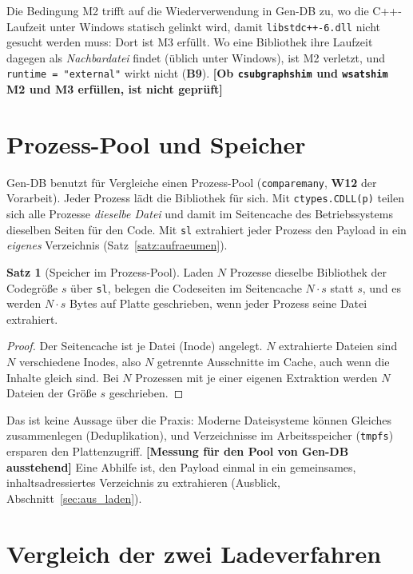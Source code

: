 \documentclass[a4paper,12pt,twoside]{report}
\DeclareRobustCommand{\_}{\ifmmode\mbox{\textunderscore}\else\textunderscore\allowbreak{}\fi}
\theoremstyle{definition}
\newtheorem{satz}{Satz}[chapter]
\newcommand{\offen}[1]{\textcolor{accentred}{\textbf{[#1]}}}
\newcommand{\W}[1]{\textbf{W#1}}
\newcommand{\Bf}[1]{\textbf{B#1}}
\begin{document}
Die Bedingung M2 trifft auf die Wiederverwendung in Gen-DB zu, wo die C++-Laufzeit unter Windows statisch gelinkt wird, damit \texttt{libstdc++-6.dll} nicht gesucht werden muss: Dort ist M3 erfüllt. Wo eine Bibliothek ihre Laufzeit dagegen als \emph{Nachbardatei} findet (üblich unter Windows), ist M2 verletzt, und \texttt{runtime = "external"} wirkt nicht (\Bf{9}). \offen{Ob \texttt{csubgraph\_shim} und \texttt{wsat\_shim} M2 und M3 erfüllen, ist nicht geprüft}

\section{Prozess-Pool und Speicher}
\label{sec:pool}

Gen-DB benutzt für Vergleiche einen Prozess-Pool (\texttt{compare\_many}, \W{12} der Vorarbeit). Jeder Prozess lädt die Bibliothek für sich. Mit \texttt{ctypes.CDLL(p)} teilen sich alle Prozesse \emph{dieselbe Datei} und damit im Seitencache des Betriebssystems dieselben Seiten für den Code. Mit \texttt{sl} extrahiert jeder Prozess den Payload in ein \emph{eigenes} Verzeichnis (Satz~\ref{satz:aufraeumen}).

\begin{satz}[Speicher im Prozess-Pool]
	\label{satz:pool}
	Laden $N$ Prozesse dieselbe Bibliothek der Codegröße $s$ über \texttt{sl}, belegen die Codeseiten im Seitencache $N\cdot s$ statt $s$, und es werden $N\cdot s$ Bytes auf Platte geschrieben, wenn jeder Prozess seine Datei extrahiert.
\end{satz}

\begin{proof}
	Der Seitencache ist je Datei (Inode) angelegt. $N$ extrahierte Dateien sind $N$ verschiedene Inodes, also $N$ getrennte Ausschnitte im Cache, auch wenn die Inhalte gleich sind. Bei $N$ Prozessen mit je einer eigenen Extraktion werden $N$ Dateien der Größe $s$ geschrieben.
\end{proof}

Das ist keine Aussage über die Praxis: Moderne Dateisysteme können Gleiches zusammenlegen (Deduplikation), und Verzeichnisse im Arbeitsspeicher (\texttt{tmpfs}) ersparen den Plattenzugriff. \offen{Messung für den Pool von Gen-DB ausstehend} Eine Abhilfe ist, den Payload einmal in ein gemeinsames, inhaltsadressiertes Verzeichnis zu extrahieren (Ausblick, Abschnitt~\ref{sec:aus_laden}).

\section{Vergleich der zwei Ladeverfahren}
\end{document}
